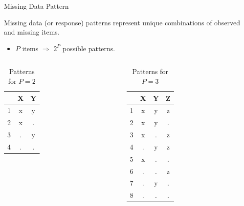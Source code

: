 \documentclass{beamer}\usepackage[]{graphicx}\usepackage[]{color}
\begin{document}
\begin{frame}{Missing Data Pattern}
  


Missing data (or response) patterns represent unique combinations of observed
and missing items.
\begin{itemize}
  \item $P$ items $\Rightarrow$ $2^P$ possible patterns.
\end{itemize}

\begin{columns}
  \begin{column}{0.45\textwidth}
    
\begin{table}[ht]
\centering
\begin{tabular}{ccc}
  \toprule
 & X & Y \\ 
  \midrule
1 & x & y \\ 
  2 & x & . \\ 
  3 & . & y \\ 
  4 & . & . \\ 
   \bottomrule
\end{tabular}
\caption{Patterns for $P = 2$} 
\end{table}

    
  \end{column}
  \begin{column}{0.45\textwidth}
\begin{table}[ht]
\centering
\begin{tabular}{cccc}
  \toprule
 & X & Y & Z \\ 
  \midrule
1 & x & y & z \\ 
  2 & x & y & . \\ 
  3 & x & . & z \\ 
  4 & . & y & z \\ 
  5 & x & . & . \\ 
  6 & . & . & z \\ 
  7 & . & y & . \\ 
  8 & . & . & . \\ 
   \bottomrule
\end{tabular}
\caption{Patterns for $P = 3$} 
\end{table}

     
    \end{column}
  \end{columns}
  
\end{frame}
\end{document}
